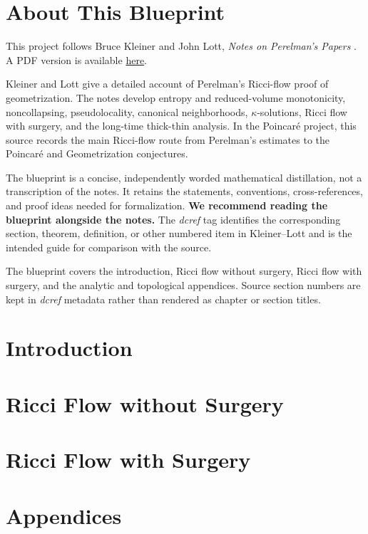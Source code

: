 

\chapter*{About This Blueprint}

This project follows Bruce Kleiner and John Lott, \emph{Notes on Perelman's
Papers} \cite{KleinerLottwebsite}. A PDF version is available
\href{https://arxiv.org/pdf/math/0605667}{here}.

Kleiner and Lott give a detailed account of Perelman's Ricci-flow proof of
geometrization. The notes develop entropy and reduced-volume monotonicity,
noncollapsing, pseudolocality, canonical neighborhoods, $\kappa$-solutions,
Ricci flow with surgery, and the long-time thick-thin analysis. In the
Poincar\'e project, this source records the main Ricci-flow route from
Perelman's estimates to the Poincar\'e and Geometrization conjectures.

The blueprint is a concise, independently worded mathematical distillation,
not a transcription of the notes. It retains the statements, conventions,
cross-references, and proof ideas needed for formalization. \textbf{We
recommend reading the blueprint alongside the notes.} The \emph{dcref} tag
identifies the corresponding section, theorem, definition, or other numbered
item in Kleiner--Lott and is the intended guide for comparison with the
source.

The blueprint covers the introduction, Ricci flow without surgery, Ricci flow
with surgery, and the analytic and topological appendices. Source section
numbers are kept in \emph{dcref} metadata rather than rendered as chapter or
section titles.

\chapter{Introduction}


\chapter{Ricci Flow without Surgery}
\label{chap:kl-without-surgery}


\chapter{Ricci Flow with Surgery}
\label{chap:kl-with-surgery}


\appendix
\chapter{Appendices}

